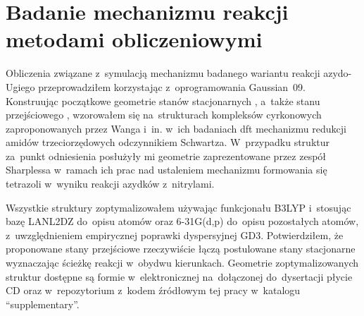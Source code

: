 \section{Badanie mechanizmu reakcji metodami obliczeniowymi}
Obliczenia związane z~symulacją mechanizmu badanego wariantu reakcji azydo-Ugiego przeprowadziłem
  korzystając z~oprogramowania Gaussian~09.
Konstruując początkowe geometrie stanów stacjonarnych ,
  a~także stanu przejściowego , wzorowałem się na~strukturach kompleksów
  cyrkonowych zaproponowanych przez Wanga i~in. w~ich badaniach \gls{dft} mechanizmu
  redukcji amidów trzeciorzędowych odczynnikiem Schwartza.
W~przypadku struktur  za~punkt odniesienia posłużyły
  mi geometrie zaprezentowane przez zespół Sharplessa w~ramach ich prac nad ustaleniem mechanizmu
  formowania się tetrazoli w~wyniku reakcji azydków z~nitrylami.

Wszystkie struktury zoptymalizowałem używając funkcjonału B3LYP i~stosując bazę LANL2DZ
  do~opisu atomów  oraz 6-31G(d,p) do~opisu pozostałych atomów,
  z~uwzględnieniem empirycznej poprawki dyspersyjnej GD3.
Potwierdziłem, że proponowane stany przejściowe rzeczywiście łączą postulowane stany stacjonarne
  wyznaczając ścieżkę reakcji w~obydwu kierunkach.
Geometrie zoptymalizowanych struktur dostępne są formie w~elektronicznej na~dołączonej
  do~dysertacji płycie CD oraz w~repozytorium\sidenote{\repourl} z~kodem źródłowym tej pracy
  w~katalogu \enquote{supplementary}.

